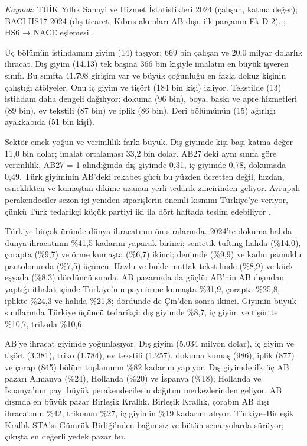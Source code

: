 \endgroup

\emph{Kaynak:} TÜİK Yıllık Sanayi ve Hizmet İstatistikleri 2024 (çalışan, katma değer); BACI HS17 2024 (dış ticaret; Kıbrıs akımları AB dışı, ilk parçanın Ek D-2). \etiketV{}; HS6 → NACE eşlemesi \etiketT{}.

Üç bölümün istihdamını giyim (14) taşıyor: 669 bin çalışan ve 20,0 milyar dolarlık ihracat. Dış giyim (14.13) tek başına 366 bin kişiyle imalatın en büyük işveren sınıfı. Bu sınıfta 41.798 girişim var ve büyük çoğunluğu en fazla dokuz kişinin çalıştığı atölyeler. Onu iç giyim ve tişört (184 bin kişi) izliyor. Tekstilde (13) istihdam daha dengeli dağılıyor: dokuma (96 bin), boya, baskı ve apre hizmetleri (89 bin), ev tekstili (87 bin) ve iplik (86 bin). Deri bölümünün (15) ağırlığı ayakkabıda (51 bin kişi).

Sektör emek yoğun ve verimlilik farkı büyük. Dış giyimde kişi başı katma değer 11,0 bin dolar; imalat ortalaması 33,2 bin dolar. AB27'deki aynı sınıfa göre verimlilik, AB27 = 1 alındığında dış giyimde 0,31, iç giyimde 0,78, dokumada 0,49. Türk giyiminin AB'deki rekabet gücü bu yüzden ücretten değil, hızdan, esneklikten ve kumaştan dikime uzanan yerli tedarik zincirinden geliyor. Avrupalı perakendeciler sezon içi yeniden siparişlerin önemli kısmını Türkiye'ye veriyor, çünkü Türk tedarikçi küçük partiyi iki ila dört haftada teslim edebiliyor \etiketH{}.

Türkiye birçok üründe dünya ihracatının ön sıralarında. 2024'te dokuma halıda dünya ihracatının \%41,5 kadarını yaparak birinci; sentetik tufting halıda (\%14,0), çorapta (\%9,7) ve örme kumaşta (\%6,7) ikinci; denimde (\%9,9) ve kadın pamuklu pantolonunda (\%7,5) üçüncü. Havlu ve bukle mutfak tekstilinde (\%8,9) ve kürk eşyada (\%8,3) dördüncü sırada. AB pazarında da güçlü: AB'nin AB dışından yaptığı ithalat içinde Türkiye'nin payı örme kumaşta \%31,9, çorapta \%25,8, iplikte \%24,3 ve halıda \%21,8; dördünde de Çin'den sonra ikinci. Giyimin büyük sınıflarında Türkiye üçüncü tedarikçi: dış giyimde \%8,7, iç giyim ve tişörtte \%10,7, trikoda \%10,6.

AB'ye ihracat giyimde yoğunlaşıyor. Dış giyim (5.034 milyon dolar), iç giyim ve tişört (3.381), triko (1.784), ev tekstili (1.257), dokuma kumaş (986), iplik (877) ve çorap (845) bölüm toplamının \%82 kadarını yapıyor. Dış giyimde ilk üç AB pazarı Almanya (\%24), Hollanda (\%20) ve İspanya (\%18); Hollanda ve İspanya'nın payı büyük perakendecilerin dağıtım merkezlerinden geliyor. AB dışında en büyük pazar Birleşik Krallık. Birleşik Krallık, çorabın AB dışı ihracatının \%42, trikonun \%27, iç giyimin \%19 kadarını alıyor. Türkiye--Birleşik Krallık STA'sı Gümrük Birliği'nden bağımsız ve bütün senaryolarda sürüyor; çıkışta en değerli yedek pazar bu.


